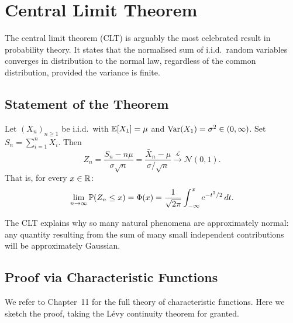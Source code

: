 \chapter{Central Limit Theorem}
\label{ch:clt}

\begin{intuition}
The central limit theorem (CLT) is arguably the most celebrated result in
probability theory. It states that the normalised sum of i.i.d.\ random variables
converges in distribution to the normal law, regardless of the common distribution,
provided the variance is finite.
\end{intuition}

\section{Statement of the Theorem}

\begin{theorem}
\label{thm:clt}
Let $(X_n)_{n \geq 1}$ be i.i.d.\ with $\mathbb{E}[X_1] = \mu$ and
$\mathrm{Var}(X_1) = \sigma^2 \in (0, \infty)$. Set $S_n = \sum_{i=1}^n X_i$. Then
\[
    Z_n = \frac{S_n - n\mu}{\sigma\sqrt{n}}
    = \frac{\bar{X}_n - \mu}{\sigma/\sqrt{n}}
    \xrightarrow{\mathcal{L}} \mathcal{N}(0, 1).
\]
That is, for every $x \in \mathbb{R}$:
\[
    \lim_{n \to \infty}\mathbb{P}(Z_n \leq x) = \Phi(x)
    = \frac{1}{\sqrt{2\pi}}\int_{-\infty}^{x} e^{-t^2/2}\,dt.
\]
\end{theorem}

\begin{intuition}[title=\textbf{Why is the normal distribution so ubiquitous?}]
The CLT explains why so many natural phenomena are approximately normal: any
quantity resulting from the sum of many small independent contributions will be
approximately Gaussian.
\end{intuition}

\section{Proof via Characteristic Functions}

We refer to Chapter~11 for the full theory of characteristic functions. Here we
sketch the proof, taking the L\'evy continuity theorem for granted.

